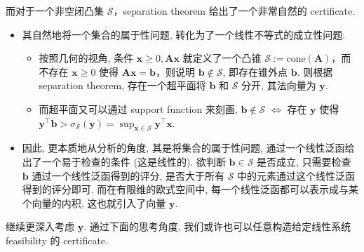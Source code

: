而对于一个非空闭凸集 $\mathcal{S}$，separation theorem 给出了一个非常自然的 certificate.

\begin{itemize}
\item {}其自然地将一个集合的属于性问题, 转化为了一个线性不等式的成立性问题.

\begin{itemize}
\item {}按照几何的视角, 条件 $\bm{x} \geq 0, \bm{A}\bm{x}$ 就定义了一个凸锥 $\mathcal{S}:= \text{cone}(\bm{A})$，而不存在 $\bm{x} \geq 0$ 使得 $\bm{A}\bm{x} = \bm{b}$，则说明 $\bm{b} \notin \mathcal{S}$, 即存在锥外点 $\bm{b}$. 则根据 separation theorem, 存在一个超平面将 $\bm{b}$ 和 $\mathcal{S}$ 分开, 其法向量为 $\bm{y}$.


\item {}而超平面又可以通过 support function 来刻画, $\bm{b} \notin \mathcal{S}$ $\iff$ 存在 $\bm{y}$ 使得 $\bm{y}^\top \bm{b} > \sigma_{\mathcal{S}}(\bm{y}) = \sup_{\bm{x} \in \mathcal{S}} \bm{y}^\top \bm{x}$.


\end{itemize}


\item {}因此, 更本质地从分析的角度, 其是将集合的属于性问题, 通过一个线性泛函给出了一个易于检查的条件 (这是线性的). 欲判断 $\bm{b} \in \mathcal{S}$ 是否成立, 只需要检查 $\bm{b}$ 通过一个线性泛函得到的评分, 是否大于所有 $\mathcal{S}$ 中的元素通过这个线性泛函得到的评分即可. 而在有限维的欧式空间中, 每一个线性泛函都可以表示成与某个向量的内积, 这也就引入了向量 $\bm{y}$.


\end{itemize}

继续更深入考虑 $\bm{y}$. 通过下面的思考角度, 我们或许也可以任意构造给定线性系统 feasibility 的 certificate.

